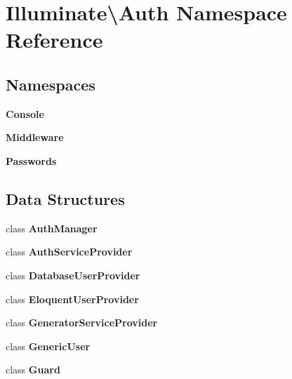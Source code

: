 \section{Illuminate\textbackslash{}Auth Namespace Reference}
\label{namespace_illuminate_1_1_auth}
\subsection*{Namespaces}
\begin{DoxyCompactItemize}
\item 
 {\bf Console}
\item 
 {\bf Middleware}
\item 
 {\bf Passwords}
\end{DoxyCompactItemize}
\subsection*{Data Structures}
\begin{DoxyCompactItemize}
\item 
class {\bf Auth\+Manager}
\item 
class {\bf Auth\+Service\+Provider}
\item 
class {\bf Database\+User\+Provider}
\item 
class {\bf Eloquent\+User\+Provider}
\item 
class {\bf Generator\+Service\+Provider}
\item 
class {\bf Generic\+User}
\item 
class {\bf Guard}
\end{DoxyCompactItemize}
